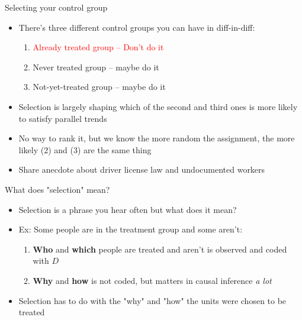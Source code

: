 \documentclass{beamer}
\begin{document}
\begin{frame}{Selecting your control group}

\begin{itemize}
\item There's three different control groups you can have in diff-in-diff:
	\begin{enumerate}
	\item \textcolor{red}{Already treated group -- Don't do it}
	\item Never treated group -- maybe do it 
	\item Not-yet-treated group -- maybe do it
	\end{enumerate}
\item Selection is largely shaping which of the second and third ones is more likely to satisfy parallel trends
\item No way to rank it, but we know the more random the assignment, the more likely (2) and (3) are the same thing
\item Share anecdote about driver license law and undocumented workers
\end{itemize}

\end{frame}




\begin{frame}{What does "selection" mean?}

\begin{itemize}
\item Selection is a phrase you hear often but what does it mean?
\item Ex: Some people are in the treatment group and some aren't:
	\begin{enumerate}
	\item \textbf{Who} and \textbf{which} people are treated and aren't is observed and coded with $D$
	\item \textbf{Why} and \textbf{how} is not coded, but matters in causal inference \emph{a lot}
	\end{enumerate}
\item Selection has to do with the "why" and "how" the units were chosen to be treated
\end{itemize}

\end{frame}
\end{document}
